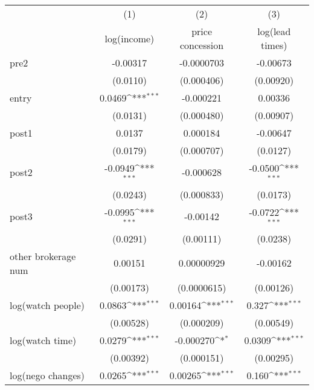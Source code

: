 {
\def\sym#1{\ifmmode^{#1}\else\(^{#1}\)\fi}
\begin{tabular}{l*{3}{c}}
\toprule
            &\multicolumn{1}{c}{(1)}&\multicolumn{1}{c}{(2)}&\multicolumn{1}{c}{(3)}\\
            &\multicolumn{1}{c}{log(income)}&\multicolumn{1}{c}{price concession}&\multicolumn{1}{c}{log(lead times)}\\
\midrule
pre2        &    -0.00317         &  -0.0000703         &    -0.00673         \\
            &    (0.0110)         &  (0.000406)         &   (0.00920)         \\
\addlinespace
entry       &      0.0469\sym{***}&   -0.000221         &     0.00336         \\
            &    (0.0131)         &  (0.000480)         &   (0.00907)         \\
\addlinespace
post1       &      0.0137         &    0.000184         &    -0.00647         \\
            &    (0.0179)         &  (0.000707)         &    (0.0127)         \\
\addlinespace
post2       &     -0.0949\sym{***}&   -0.000628         &     -0.0500\sym{***}\\
            &    (0.0243)         &  (0.000833)         &    (0.0173)         \\
\addlinespace
post3       &     -0.0995\sym{***}&    -0.00142         &     -0.0722\sym{***}\\
            &    (0.0291)         &   (0.00111)         &    (0.0238)         \\
\addlinespace
other brokerage num  &     0.00151         &  0.00000929         &    -0.00162         \\
            &   (0.00173)         & (0.0000615)         &   (0.00126)         \\
\addlinespace
log(watch people)&      0.0863\sym{***}&     0.00164\sym{***}&       0.327\sym{***}\\
            &   (0.00528)         &  (0.000209)         &   (0.00549)         \\
\addlinespace
log(watch time)&      0.0279\sym{***}&   -0.000270\sym{*}  &      0.0309\sym{***}\\
            &   (0.00392)         &  (0.000151)         &   (0.00295)         \\
\addlinespace
log(nego changes)&      0.0265\sym{***}&     0.00265\sym{***}&       0.160\sym{***}\\

\end{tabular}}
